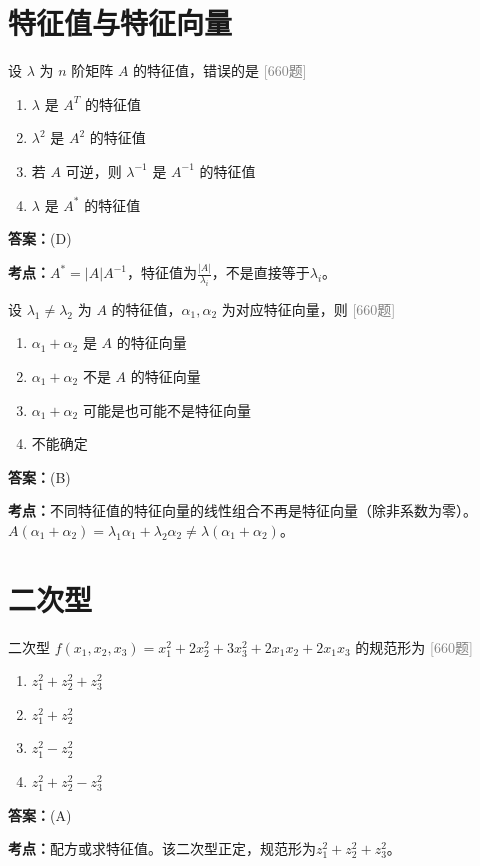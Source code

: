 \documentclass[12pt,a4paper]{ctexbook}
\newcommand{\src}[1]{\hfill\textcolor{gray}{\small\textsf{[#1]}}}
\newcommand{\ans}[1]{\begin{answerbox}\textbf{答案：}#1\end{answerbox}}
\newcommand{\kpt}[1]{\textbf{考点：}#1}
\begin{document}
\section{特征值与特征向量}

\begin{exercise}[660题·特征值性质]
设 $\lambda$ 为 $n$ 阶矩阵 $A$ 的特征值，错误的是 \hfill\src{660题}
\begin{enumerate}[label=(\Alph*),nosep]
  \item $\lambda$ 是 $A^T$ 的特征值
  \item $\lambda^2$ 是 $A^2$ 的特征值
  \item 若 $A$ 可逆，则 $\lambda^{-1}$ 是 $A^{-1}$ 的特征值
  \item $\lambda$ 是 $A^*$ 的特征值
\end{enumerate}
\end{exercise}
\ans{(D)}
\kpt{$A^*=|A|A^{-1}$，特征值为$\frac{|A|}{\lambda_i}$，不是直接等于$\lambda_i$。}

\bigskip

\begin{exercise}[660题·特征向量线性组合]
设 $\lambda_1\neq\lambda_2$ 为 $A$ 的特征值，$\alpha_1,\alpha_2$ 为对应特征向量，则 \hfill\src{660题}
\begin{enumerate}[label=(\Alph*),nosep]
  \item $\alpha_1+\alpha_2$ 是 $A$ 的特征向量
  \item $\alpha_1+\alpha_2$ 不是 $A$ 的特征向量
  \item $\alpha_1+\alpha_2$ 可能是也可能不是特征向量
  \item 不能确定
\end{enumerate}
\end{exercise}
\ans{(B)}
\kpt{不同特征值的特征向量的线性组合不再是特征向量（除非系数为零）。$A(\alpha_1+\alpha_2)=\lambda_1\alpha_1+\lambda_2\alpha_2\neq\lambda(\alpha_1+\alpha_2)$。}

\section{二次型}

\begin{exercise}[660题·二次型规范形]
二次型 $f(x_1,x_2,x_3)=x_1^2+2x_2^2+3x_3^2+2x_1x_2+2x_1x_3$ 的规范形为 \hfill\src{660题}
\begin{enumerate}[label=(\Alph*),nosep]
  \item $z_1^2+z_2^2+z_3^2$
  \item $z_1^2+z_2^2$
  \item $z_1^2-z_2^2$
  \item $z_1^2+z_2^2-z_3^2$
\end{enumerate}
\end{exercise}
\ans{(A)}
\kpt{配方或求特征值。该二次型正定，规范形为$z_1^2+z_2^2+z_3^2$。}
\end{document}
